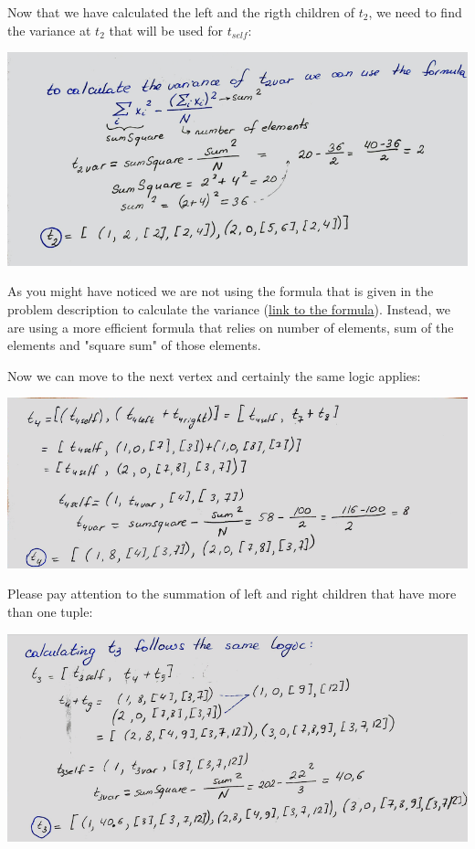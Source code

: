 \documentclass[11pt,a4paper,english]{article}
\begin{document}
        Now that we have calculated the left and the rigth children of $t_2$, we need to find the variance at $t_2$ that will be used for $t_{self}$:
        \begin{center}
          \includegraphics[width=15cm]{sc_3.png}
        \end{center}

        As you might have noticed we are not using the formula that is given in the problem description to calculate the variance (\href{https://math.stackexchange.com/questions/20593/calculate-variance-from-a-stream-of-sample-values}{link to the formula}). Instead, we are using a more efficient formula that relies on number of elements, sum of the elements and "square sum" of those elements.

        Now we can move to the next vertex and certainly the same logic applies:
        \begin{center}
          \includegraphics[width=15cm]{sc_4.png}
        \end{center}

        Please pay attention to the summation of left and right children that have more than one tuple:
        \begin{center}
          \includegraphics[width=15cm]{sc_5.png}
        \end{center}
\end{document}

